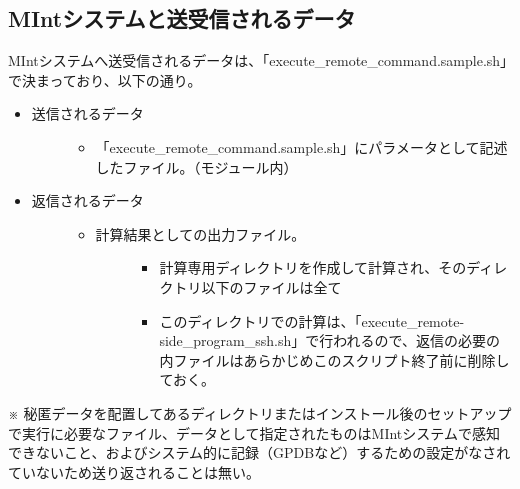 \documentclass[letterpaper,10pt,dvipdfmx,openany]{sphinxmanual}
\begin{document}
\subsection{MIntシステムと送受信されるデータ}
\label{\detokenize{using_distributed_properties:id14}}
MIntシステムへ送受信されるデータは、「execute\_remote\_command.sample.sh」で決まっており、以下の通り。
\begin{itemize}
\item {} \begin{description}
\item[{送信されるデータ}] \leavevmode\begin{itemize}
\item {} 
「execute\_remote\_command.sample.sh」にパラメータとして記述したファイル。（モジュール内）

\end{itemize}

\end{description}

\item {} \begin{description}
\item[{返信されるデータ}] \leavevmode\begin{itemize}
\item {} \begin{description}
\item[{計算結果としての出力ファイル。}] \leavevmode\begin{itemize}
\item {} 
計算専用ディレクトリを作成して計算され、そのディレクトリ以下のファイルは全て

\item {} 
このディレクトリでの計算は、「execute\_remote-side\_program\_ssh.sh」で行われるので、返信の必要の内ファイルはあらかじめこのスクリプト終了前に削除しておく。

\end{itemize}

\end{description}

\end{itemize}

\end{description}

\end{itemize}

※ 秘匿データを配置してあるディレクトリまたはインストール後のセットアップで実行に必要なファイル、データとして指定されたものはMIntシステムで感知できないこと、およびシステム的に記録（GPDBなど）するための設定がなされていないため送り返されることは無い。
\end{document}

